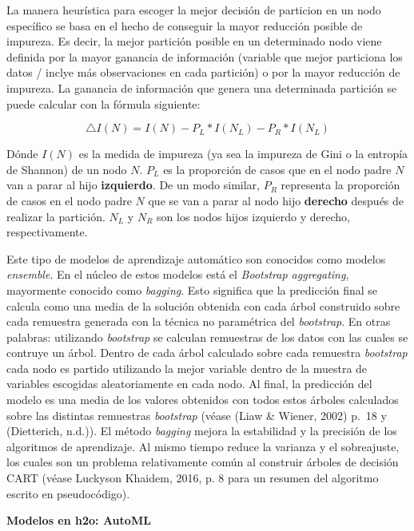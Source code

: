 \documentclass[]{DissertateUSU}
\begin{document}
\noindent La manera heurística para escoger la mejor decisión de
particion en un nodo específico se basa en el hecho de conseguir la
mayor reducción posible de impureza. Es decir, la mejor partición
posible en un determinado nodo viene definida por la mayor ganancia de
información (variable que mejor particiona los datos / inclye más
observaciones en cada partición) o por la mayor reducción de impureza.
La ganancia de información que genera una determinada partición se puede
calcular con la fórmula siguiente:

\[\bigtriangleup I(N) = I(N) - P_L * I(N_L) - P_R*I(N_L)\]

\noindent Dónde \(I(N)\) es la medida de impureza (ya sea la impureza de
Gini o la entropía de Shannon) de un nodo \(N\). \(P_L\) es la
proporción de casos que en el nodo padre \(N\) van a parar al hijo
\textbf{izquierdo}. De un modo similar, \(P_R\) representa la proporción
de casos en el nodo padre \(N\) que se van a parar al nodo hijo
\textbf{derecho} después de realizar la partición. \(N_L\) y \(N_R\) son
los nodos hijos izquierdo y derecho, respectivamente.

\setlength\parskip{7ex}

\noindent Este tipo de modelos de aprendizaje automático son conocidos
como modelos \emph{ensemble}. En el núcleo de estos modelos está el
\emph{Bootstrap aggregating}, mayormente conocido como \emph{bagging}.
Esto significa que la predicción final se calcula como una media de la
solución obtenida con cada árbol construido sobre cada remuestra
generada con la técnica no paramétrica del \emph{bootstrap}. En otras
palabras: utilizando \emph{bootstrap} se calculan remuestras de los
datos con las cuales se contruye un árbol. Dentro de cada árbol
calculado sobre cada remuestra \emph{bootstrap} cada nodo es partido
utilizando la mejor variable dentro de la muestra de variables escogidas
aleatoriamente en cada nodo. Al final, la predicción del modelo es una
media de los valores obtenidos con todos estos árboles calculados sobre
las distintas remuestras \emph{bootstrap} (véase (Liaw \& Wiener, 2002)
p.~18 y (Dietterich, n.d.)). El método \emph{bagging} mejora la
estabilidad y la precisión de los algoritmos de aprendizaje. Al mismo
tiempo reduce la varianza y el sobreajuste, los cuales son un problema
relativamente común al construir árboles de decisión CART (véase
Luckyson Khaidem, 2016, p. 8 para un resumen del algoritmo escrito en
pseudocódigo).

\setlength\parskip{7ex}

\textbf{Modelos en h2o: AutoML}
\end{document}
